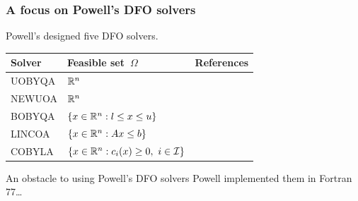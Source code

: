 \documentclass{polyu-presentation}
\newcommand{\con}[1]{c_{#1}}
\newcommand{\iub}{\mathcal{I}}
\newcommand{\xl}{l}
\newcommand{\xu}{u}
\begin{document}
\begin{frame}
    \frametitle{A focus on Powell's DFO solvers}
    
	Powell's designed five DFO solvers.

    \medskip

    \begin{center}
        \begin{tabular}{lll}
            \toprule
            Solver  & Feasible set~$\Omega$                                 & References\\
            \midrule
            UOBYQA  & $\mathbb{R}^n$                                                & \textcite{Powell_2002}\\
            NEWUOA  & $\mathbb{R}^n$                                                & \textcite{Powell_2006}\\
            BOBYQA  & $\set{x \in \R^n : \xl \le x \le \xu}$                & \textcite{Powell_2009}\\
            LINCOA  & $\{x \in \mathbb{R}^n : A x \le b\}$                        & \textcite{Powell_2015}\\
            COBYLA  & $\set{x \in \R^n : \con{i}(x) \ge 0, ~ i \in \iub}$   & \textcite{Powell_1994}\\
            \bottomrule
        \end{tabular}
    \end{center}

    \medskip

    \begin{block}{An obstacle to using Powell’s DFO solvers}
        Powell implemented them in \alert{Fortran 77}\dots
    \end{block}
\end{frame}
\end{document}

